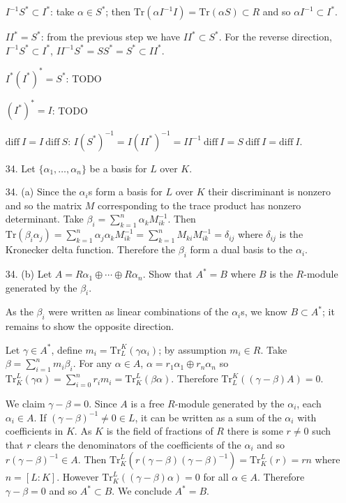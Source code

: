 \documentclass{article}
\newcommand{\trace}[1]{\text{Tr}(#1)}
\newcommand{\diff}[1]{\text{diff}\ #1}
\begin{document}
\begin{enumerate}
$I^{-1}S^{*} \subset I^{*}$: take $\alpha \in S^{*}$; then $\trace{\alpha I^{-1} I} = \trace{\alpha S} \subset R$ and so $\alpha I^{-1} \subset I^{*}$.

$II^{*} = S^{*}$: from the previous step we have $II^{*} \subset S^{*}$.  For the reverse direction, $I^{-1}S^{*} \subset I^{*}$, $II^{-1}S^{*} = SS^{*} = S^{*} \subset II^{*}$.

$I^{*}(I^{*})^{*} = S^{*}$: TODO

$(I^{*})^{*} = I$: TODO


$\diff{I} = I\ \diff {S}$: $I(S^{*})^{-1} = I(II^{*})^{-1} = II^{-1}\ \diff{I} = S\ \diff {I} = \diff{I}$.

\item[34.] Let $\{ \alpha_1, \ldots, \alpha_n \}$ be a basis for $L$ over $K$.
\item[34. (a)] Since the $\alpha_i$s form a basis for $L$ over $K$ their discriminant is nonzero and so the matrix $M$ corresponding to the trace product has nonzero determinant.  Take $\beta_i = \sum_{k = 1}^{n} \alpha_k M^{-1}_{ik}$.  Then $\trace{\beta_i\alpha_j} = \sum_{k = 1}^{n} \alpha_j\alpha_k M^{-1}_{ik} = \sum_{k = 1}^n M_{ki} M^{-1}_{ik} = \delta_{ij}$ where $\delta_{ij}$ is the Kronecker delta function.  Therefore the $\beta_i$ form a dual basis to the $\alpha_i$.
\item[34. (b)]
Let $A = R\alpha_1 \oplus \cdots \oplus R \alpha_n$.  Show that $A^{*} = B$ where $B$ is the $R$-module generated by the $\beta_i$.

As the $\beta_i$ were written as linear combinations of the $\alpha_i$s, we know $B \subset A^{*}$; it remains to show the opposite direction.

Let $\gamma \in A^{*}$, define $m_i = \text{Tr}^{K}_{L}(\gamma\alpha_i)$; by assumption $m_i \in R$.  Take $\beta = \sum_{i=1}^{n} m_i \beta_i$.  For any $\alpha \in A$, $\alpha = r_1 \alpha_1 \oplus r_n \alpha_n$ so $\text{Tr}^{L}_{K}(\gamma\alpha) = \sum_{i = 0}^{n} r_i m_i = \text{Tr}^{L}_{K}(\beta\alpha)$.  Therefore $\text{Tr}^{K}_{L}((\gamma - \beta)A) = 0$.

We claim $\gamma - \beta = 0$.  Since $A$ is a free $R$-module generated by the $\alpha_i$, each $\alpha_i \in A$.  If $(\gamma - \beta)^{-1} \neq 0 \in L$, it can be written as a sum of the $\alpha_i$ with coefficients in $K$.  As $K$ is the field of fractions of $R$ there is some $r \neq 0$ such that $r$ clears the denominators of the coefficients of the $\alpha_i$ and so $r(\gamma - \beta)^{-1} \in A$.  Then $\text{Tr}^{L}_{K}(r(\gamma - \beta)(\gamma - \beta)^{-1}) = \text{Tr}^{L}_{K}(r) = rn$ where $n = [L : K]$.  However $\text{Tr}^{L}_{K}((\gamma - \beta)\alpha) = 0$ for all $\alpha \in A$.  Therefore $\gamma - \beta = 0$ and so $A^{*} \subset B$.  We conclude $A^{*} = B$.


\end{enumerate}
\end{document}
